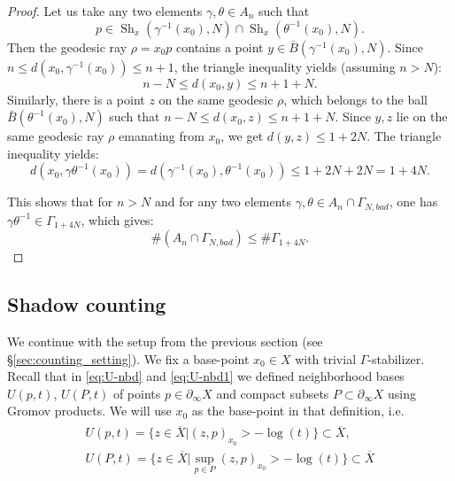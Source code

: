 \documentclass[12pt]{amsbook}%
\theoremstyle{definition}
\theoremstyle{remark}
\numberwithin{section}{chapter}
\numberwithin{subsection}{section}
\numberwithin{figure}{chapter}
\DeclareMathOperator{\Sh}{Sh}
\def\Ga{\Gamma}
\def\geo{\partial_\infty}
\def\ol{\overline}
\begin{document}
{{\begin{proof}
Let us take any two elements $\gamma, \theta \in A_n$ such that
 $$p\in \Sh_{x}( \gamma^{-1}(x_0), N) \cap \Sh_x(\theta^{-1}(x_0) , N) .$$
   Then 
the geodesic ray $\rho=x_0p$ contains a point $y \in \bar{B}(\gamma^{-1}(x_0),N)$. Since $n \leqslant d(x_0, \gamma^{-1}(x_0)) \leqslant n+1$, the triangle inequality yields (assuming $n > N$): 
\begin{equation*}
n - N\leqslant d(x_0,y) \leqslant n+1 +N . 
\end{equation*} 
Similarly, there is a point $z $ on the same geodesic $\rho$, which belongs to the ball $\bar{B}(\theta^{-1}(x_0), N)$ such that 
$n- N \leqslant d(x_0, z) \leqslant n+1 + N$. Since $y, z$ lie on the same geodesic ray $\rho$ emanating from $x_0$, we get 
$d(y,z) \leqslant 1 + 2N$. The triangle inequality yields:
 $$d(x_0, \gamma \theta^{-1}(x_0)) =d(\gamma^{-1}(x_0),\theta^{-1}(x_0)) \leqslant 1 + 2N + 2N= 1 + 4N. $$ 

This shows that for $n >N$ and for any two elements $\gamma, \theta \in A_n \cap \Gamma_{N,bad}$, one has $\gamma\theta^{-1} \in \Ga_{1+4N}$, 
which gives: 
\begin{equation} \label{eq_bad_annuli_count}
\#  \left ( A_n \cap \Gamma_{N,bad} \right ) \leqslant \# \Gamma_{1+4N}.   
\end{equation} 
\end{proof}








\subsection{Shadow counting} \label{section_shadow_counting}



We continue with the setup from the previous section (see \S \ref{sec:counting_setting}). 
We fix a base-point $x_0\in X$ with trivial $\Ga$-stabilizer. %
Recall that in \eqref{eq:U-nbd} and \eqref{eq:U-nbd1} we defined neighborhood bases $U(p,t)$, $U(P,t)$ of points $p\in \geo X$ and compact subsets $P\subset \geo X$ using Gromov products. 
We will use $x_0$ as the base-point in that definition, i.e. 
\begin{align} 
\begin{aligned}\label{eq_Upt}
U(p,t) = \{ z \in \ol{X} |  (z, p)_{x_0} > - \log(t)  \}\subset \ol{X},\\
U(P,t) = \{ z \in \ol{X} | \sup_{p\in P} (z, p)_{x_0} > - \log(t)  \}\subset \ol{X}
\end{aligned}
\end{align}

}}
\end{document}
